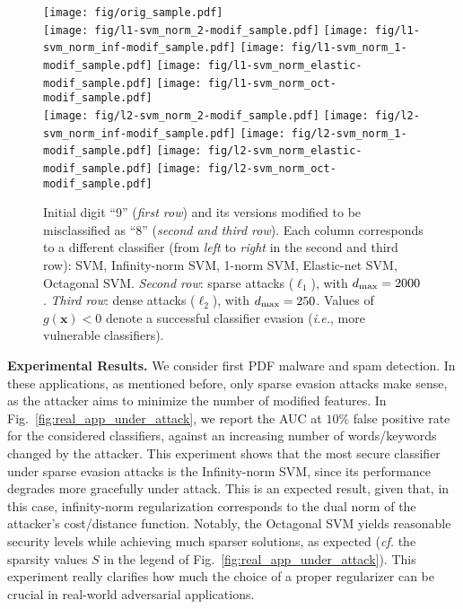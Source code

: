 \documentclass[runningheads,a4paper]{llncs}
\newcommand{\ie}{\emph{i.e.}}
\newcommand{\cf}{\emph{cf.}}
\newcommand{\vct}[1]{\ensuremath{\boldsymbol{#1}}}
\newcommand{\myparagraph}[1]{\smallskip \noindent \textbf{#1.}}
\begin{document}
\begin{figure*}[t]
\centering
	\texttt{[image: fig/orig\_sample.pdf]} \\%
	\texttt{[image: fig/l1-svm\_norm\_2-modif\_sample.pdf]}%
	\texttt{[image: fig/l1-svm\_norm\_inf-modif\_sample.pdf]}%
	\texttt{[image: fig/l1-svm\_norm\_1-modif\_sample.pdf]}
	\texttt{[image: fig/l1-svm\_norm\_elastic-modif\_sample.pdf]}
	\texttt{[image: fig/l1-svm\_norm\_oct-modif\_sample.pdf]} \\
	\texttt{[image: fig/l2-svm\_norm\_2-modif\_sample.pdf]}
	\texttt{[image: fig/l2-svm\_norm\_inf-modif\_sample.pdf]}%
	\texttt{[image: fig/l2-svm\_norm\_1-modif\_sample.pdf]}%
	\texttt{[image: fig/l2-svm\_norm\_elastic-modif\_sample.pdf]}%
	\texttt{[image: fig/l2-svm\_norm\_oct-modif\_sample.pdf]}%
	\caption{Initial digit ``9'' (\emph{first row}) and its versions modified to be misclassified as ``8'' (\emph{second and third row}). Each column corresponds to a different classifier (from \emph{left} to \emph{right} in the second and third row): SVM, Infinity-norm SVM, 1-norm SVM, Elastic-net SVM, Octagonal SVM. \emph{Second row}: sparse attacks ($\ell_{1}$), with $d_{\rm max}=2000$. \emph{Third row}: dense attacks ($\ell_{2}$), with $d_{\rm max}=250$. Values of $g(\vct x) < 0$ denote a successful classifier evasion (\ie, more vulnerable classifiers).}
	\label{fig:digit_modified_samples}
\end{figure*}

\myparagraph{Experimental Results}
We consider first PDF malware and spam detection. In these applications, as mentioned before, only sparse evasion attacks make sense, as the attacker aims to minimize the number of modified features.
In Fig.~\ref{fig:real_app_under_attack}, we report the AUC at $10\%$ false positive rate for the considered classifiers, against an increasing number of words/keywords changed by the attacker.
This experiment shows that the most secure classifier under sparse evasion attacks is the Infinity-norm SVM, since its performance degrades more gracefully under attack. This is an expected result, given that, in this case, infinity-norm regularization corresponds to the dual norm of the attacker's cost/distance function. Notably, the Octagonal SVM yields reasonable security levels while achieving much sparser solutions, as expected (\cf{} the sparsity values $S$ in the legend of Fig.~\ref{fig:real_app_under_attack}). This experiment really clarifies how much the choice of a proper regularizer can be crucial in real-world adversarial applications.
\end{document}
